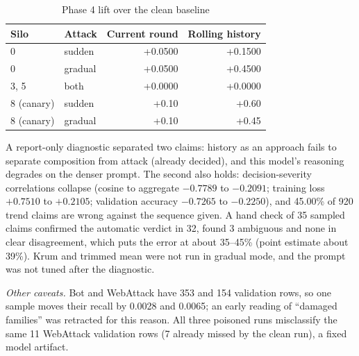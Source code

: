 \begin{table}[h]
\centering
\caption{Phase 4 lift over the clean baseline}
\label{tab:phase4lift}
\footnotesize
\begin{tabular}{@{}llrr@{}}
\toprule
Silo & Attack & Current round & Rolling history\\
\midrule
0 & sudden & +0.0500 & +0.1500\\ %
0 & gradual & +0.0500 & +0.4500\\ %
3, 5 & both & +0.0000 & +0.0000\\ %
8 (canary) & sudden & +0.10 & +0.60\\ %
8 (canary) & gradual & +0.10 & +0.45\\ %
\bottomrule
\end{tabular}
\end{table}

A report-only diagnostic separated two claims: history as an approach fails to separate
composition from attack (already decided), and this model's reasoning degrades on the
denser prompt. The second also holds: decision-severity correlations collapse (cosine to
aggregate $-0.7789$ to $-0.2091$; training loss $+0.7510$ to $+0.2105$; validation %
accuracy $-0.7265$ to $-0.2250$), and 45.00\% of 920 trend claims are wrong against %
the sequence given. A hand check of 35 sampled claims confirmed the automatic verdict in %
32, found 3 ambiguous and none in clear disagreement, which puts the error at about %
35--45\% (point estimate about 39\%). Krum and trimmed mean were not run in gradual %
mode, and the prompt was not tuned after the diagnostic.

\emph{Other caveats.} Bot and WebAttack have 353 and 154 validation rows, so one sample %
moves their recall by 0.0028 and 0.0065; an early reading of ``damaged families'' was %
retracted for this reason. All three poisoned runs misclassify the same 11 WebAttack %
validation rows (7 already missed by the clean run), a fixed model artifact. %

